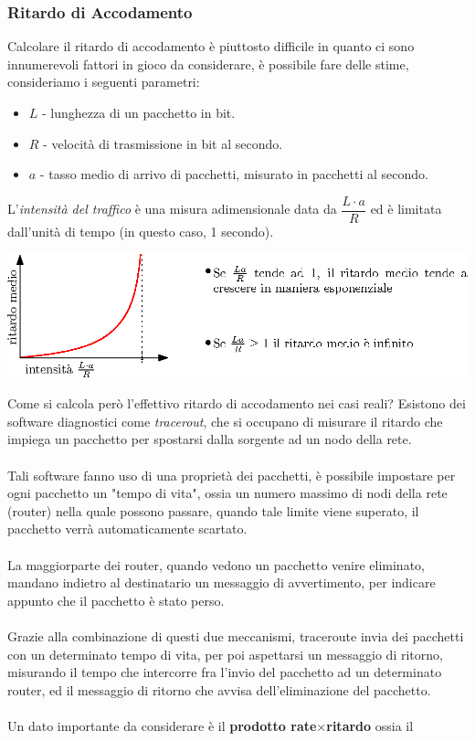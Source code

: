 \documentclass[12pt, letterpaper]{article}
\newcommand{\acc}{\\\hphantom{}\\}
\begin{document}
\subsubsection{Ritardo di Accodamento}
Calcolare il ritardo di accodamento è piuttosto difficile in quanto ci sono innumerevoli fattori in gioco da 
considerare, è possibile fare delle stime, consideriamo i seguenti parametri:\begin{itemize}
    \item $L$ - lunghezza di un pacchetto in bit. 
    \item $R$ - velocità di trasmissione in bit al secondo.
    \item $a$ - tasso medio di arrivo di pacchetti, misurato in pacchetti al secondo.
\end{itemize}
L'\textit{intensità del traffico} è una misura adimensionale data da $\dfrac{L\cdot a}{R}$ ed è limitata 
dall'unità di tempo (in questo caso, 1 secondo).\begin{center}
    \includegraphics[width=\textwidth ]{images/traffico.eps}
\end{center}
Come si calcola però l'effettivo ritardo di accodamento nei casi reali? Esistono dei software 
diagnostici come \textit{tracerout}, che si occupano di misurare il ritardo che impiega un pacchetto 
per spostarsi dalla sorgente ad un nodo della rete. \acc Tali software fanno uso di una proprietà dei pacchetti, 
è possibile impostare per ogni pacchetto un "tempo di vita", ossia un numero massimo di nodi della rete (router) 
nella quale possono passare, quando tale limite viene superato, il pacchetto verrà automaticamente scartato.\acc 
La maggiorparte dei router, quando vedono un pacchetto venire eliminato, mandano indietro al destinatario un messaggio di 
avvertimento, per indicare appunto che il pacchetto è stato perso.\acc Grazie alla combinazione di questi due meccanismi, 
traceroute invia dei pacchetti con un determinato tempo di vita, per poi aspettarsi un messaggio di ritorno, misurando il 
tempo che intercorre fra l'invio del pacchetto ad un determinato router, ed il messaggio di ritorno che avvisa dell'eliminazione 
del pacchetto.\acc 
Un dato importante da considerare è il \textbf{prodotto rate$\times$ritardo} ossia il 
\end{document}
